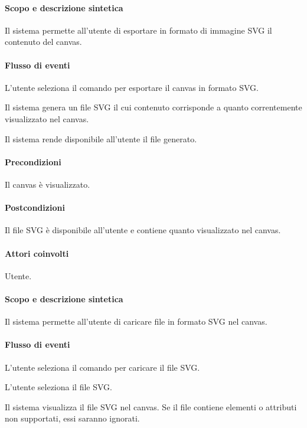 \paragraph{Scopo e descrizione sintetica} 
Il sistema permette all'utente di esportare in formato di immagine SVG il contenuto del canvas.
\paragraph{Flusso di eventi}
\begin{elenconumerato}[\textbf{}]{\subsubsecindent}
\item L'utente seleziona il comando per esportare il canvas in formato SVG.
\item Il sistema genera un file SVG il cui contenuto corrisponde a quanto correntemente visualizzato nel canvas.
\item Il sistema rende disponibile all'utente il file generato.
\end{elenconumerato}
\paragraph{Precondizioni} Il canvas \`e visualizzato.
\paragraph{Postcondizioni} Il file SVG \`e disponibile all'utente e contiene quanto visualizzato nel canvas.

\paragraph{Attori coinvolti} Utente.
\paragraph{Scopo e descrizione sintetica} 
Il sistema permette all'utente di caricare file in formato SVG nel canvas.
\paragraph{Flusso di eventi}
\begin{elenconumerato}[\textbf{}]{\subsubsecindent}
\item L'utente seleziona il comando per caricare il file SVG.
\item L'utente seleziona il file SVG.
\item Il sistema visualizza il file SVG nel canvas. Se il file contiene elementi o attributi non supportati, essi saranno ignorati.
\end{elenconumerato}
